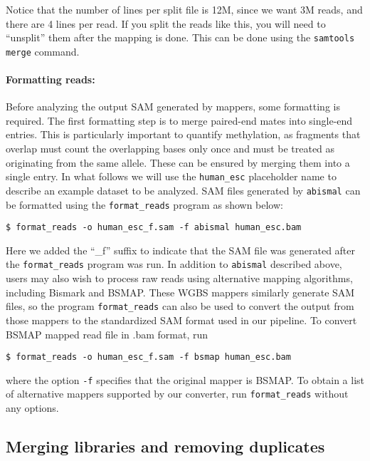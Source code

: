 \documentclass[10pt]{article}
\newcommand{\prog}[1]{\texttt{#1}}
\newcommand{\op}[1]{\texttt{#1}}
\begin{document}
Notice that the number of lines per split file is 12M, since we want
3M reads, and there are 4 lines per read. If you split the reads like
this, you will need to ``unsplit'' them after the mapping is done. This
can be done using the \prog{samtools merge} command.

\paragraph{Formatting reads:}
\label{sec:formatting-reads}

Before analyzing the output SAM generated by mappers, some formatting
is required. The first formatting step is to merge paired-end mates
into single-end entries. This is particularly important to quantify
methylation, as fragments that overlap must count the overlapping
bases only once and must be treated as originating from the same
allele. These can be ensured by merging them into a single entry.  In
what follows we will use the \texttt{human\_esc} placeholder name to
describe an example dataset to be analyzed.  SAM files generated by
\prog{abismal} can be formatted using the \prog{format\_reads} program
as shown below:

\begin{verbatim}
$ format_reads -o human_esc_f.sam -f abismal human_esc.bam
\end{verbatim}

Here we added the ``\_f'' suffix to indicate that the SAM file was
generated after the \prog{format\_reads} program was run.  In addition
to \prog{abismal} described above, users may also wish to process raw
reads using alternative mapping algorithms, including Bismark and
BSMAP. These WGBS mappers similarly generate SAM files, so the
program \prog{format\_reads} can also be used to convert the output
from those mappers to the standardized SAM format used in our
pipeline. To convert BSMAP mapped read file in .bam format, run

\begin{verbatim}
$ format_reads -o human_esc_f.sam -f bsmap human_esc.bam
\end{verbatim}

where the option \op{-f} specifies that the original mapper is
BSMAP. To obtain a list of alternative mappers supported by our
converter, run \prog{format\_reads} without any options.

\subsection{Merging libraries and removing duplicates}
\end{document}
